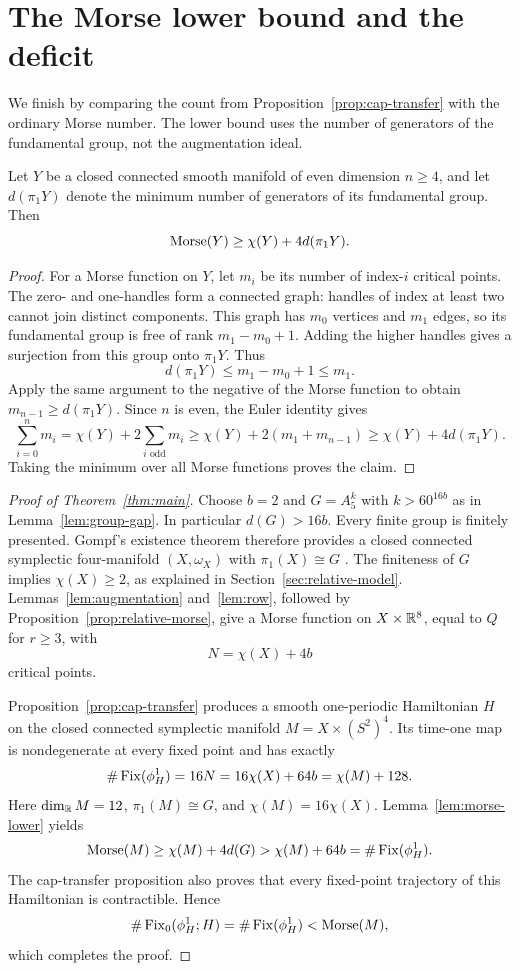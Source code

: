 \section{The Morse lower bound and the deficit}
\label{sec:counting}

We finish by comparing the count from Proposition~\ref{prop:cap-transfer}
with the ordinary Morse number.  The lower bound uses the number of
generators of the fundamental group, not the augmentation ideal.

\begin{lemma}
\label{lem:morse-lower}
Let $Y$ be a closed connected smooth manifold of even dimension
$n\geq4$, and let $d(\pi_1Y)$ denote the minimum number of generators
of its fundamental group.  Then
\[
 \operatorname{Morse}(Y)\geq\chi(Y)+4d(\pi_1Y).
\]
\end{lemma}

\begin{proof}
For a Morse function on $Y$, let $m_i$ be its number of index-$i$
critical points.  The zero- and one-handles form a connected graph:
handles of index at least two cannot join distinct components.
This graph has $m_0$ vertices and $m_1$ edges, so its fundamental
group is free of rank $m_1-m_0+1$.  Adding the higher handles gives
a surjection from this group onto $\pi_1Y$.  Thus
\[
 d(\pi_1Y)\leq m_1-m_0+1\leq m_1.
\]
Apply the same argument to the negative of the Morse function to
obtain $m_{n-1}\geq d(\pi_1Y)$.  Since $n$ is even, the Euler
identity gives
\[
 \sum_{i=0}^{n}m_i
 =\chi(Y)+2\sum_{i\text{ odd}}m_i
 \geq\chi(Y)+2(m_1+m_{n-1})
 \geq\chi(Y)+4d(\pi_1Y).
\]
Taking the minimum over all Morse functions proves the claim.
\end{proof}

\begin{proof}[Proof of Theorem~\ref{thm:main}]
Choose $b=2$ and $G=A_5^k$ with $k>60^{16b}$ as in
Lemma~\ref{lem:group-gap}.  In particular $d(G)>16b$.
Every finite group is finitely presented.  Gompf's existence theorem
therefore provides a closed connected symplectic four-manifold
$(X,\omega_X)$ with $\pi_1(X)\cong G$ \cite[Theorem~3.1]{Gompf1992}.
The finiteness of $G$ implies $\chi(X)\geq2$, as explained in
Section~\ref{sec:relative-model}.  Lemmas~\ref{lem:augmentation}
and~\ref{lem:row}, followed by Proposition~\ref{prop:relative-morse},
give a Morse function on $X\times\mathbb R^8$, equal to $Q$ for $r\geq3$,
with
\[
 N=\chi(X)+4b
\]
critical points.

Proposition~\ref{prop:cap-transfer} produces a smooth one-periodic
Hamiltonian $H$ on the closed connected symplectic manifold
$M=X\times(S^2)^4$.  Its time-one map is nondegenerate at every
fixed point and has exactly
\begin{equation}
 \#\operatorname{Fix}(\phi_H^1)=16N
 =16\chi(X)+64b=\chi(M)+128.
 \label{eq:final-fixed-count}
\end{equation}
Here $\dim_\mathbb R M=12$, $\pi_1(M)\cong G$, and
$\chi(M)=16\chi(X)$.  Lemma~\ref{lem:morse-lower} yields
\[
 \operatorname{Morse}(M)\geq\chi(M)+4d(G)
 >\chi(M)+64b=\#\operatorname{Fix}(\phi_H^1).
\]
The cap-transfer proposition also proves that every fixed-point
trajectory of this Hamiltonian is contractible. Hence
\[
 \#\operatorname{Fix}_0(\phi_H^1;H)=\#\operatorname{Fix}(\phi_H^1)<\operatorname{Morse}(M),
\]
which completes the proof.
\end{proof}

